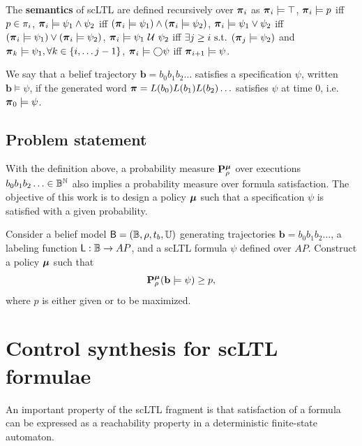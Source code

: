 \documentclass{ifacconf}
\begin{document}
\begin{definition}
 The \textbf{semantics} of scLTL are defined recursively  over ${\boldsymbol{\pi}}_i$ as
    ${\boldsymbol{\pi}}_i \models \top$,
    ${\boldsymbol{\pi}}_i \models p$ iff $p \in \pi_i$,
    ${\boldsymbol{\pi}}_i \models \psi_1 \wedge  \psi_2  $ iff $ ( {\boldsymbol{\pi}}_i \models \psi_1 ) \wedge ( {\boldsymbol{\pi}}_i \models \psi_2 ) $,
    ${\boldsymbol{\pi}}_i \models \psi_1 \vee  \psi_2  $ iff $ ( {\boldsymbol{\pi}}_i \models \psi_1 ) \vee ( {\boldsymbol{\pi}}_i \models \psi_2 ) $,
    ${\boldsymbol{\pi}}_i \models  \psi_1 \ \mathcal{U}\  \psi_2 $ iff $\exists j \geq i \text{ s.t. } ({\boldsymbol{\pi}}_j \models \psi_2 ) $ and ${\boldsymbol{\pi}}_k \models \psi_1, \forall k \in \{i, \ldots j-1\}$,
    ${\boldsymbol{\pi}}_i \models \bigcirc \psi$ iff ${\boldsymbol{\pi}}_{i+1} \models \psi$.
\end{definition}

We say that a belief trajectory $\mathbf{b} = b_0 b_1 b_2 \ldots$ satisfies a specification $\psi$, written $\mathbf{b} \models \psi$, if the generated word ${\boldsymbol{\pi}} = L(b_0) L(b_1) L(b_2) \ldots$ satisfies $\psi$ at time 0, i.e. ${\boldsymbol{\pi}}_0 \models \psi$.


\subsection{Problem statement}

With the definition above, a probability measure $\mathbf{P}_\rho^{\boldsymbol{\mu}}$ over executions $b_0 b_1 b_2 \ldots\in \mathbb{B}^{\mathbb N}$ also implies a probability measure over formula satisfaction. The objective of this work is to design a policy ${\boldsymbol{\mu}}$ such that a specification $\psi$ is satisfied with a given probability.

\begin{problem}
\label{prob:main}
  Consider a belief model $\mathsf{B} = (\mathbb{B}, \rho, t_b, {\mathbb{U}})$ generating trajectories $\mathbf{b} = b_0 b_1 b_2 \ldots$, a labeling function $\mathsf{L} : \mathbb{B} \rightarrow AP$, and a scLTL formula $\psi$ defined over $AP$. Construct a policy ${\boldsymbol{\mu}}$ such that
  \begin{equation}
    \mathbf{P}_\rho^{\boldsymbol{\mu}} ( \mathbf{b} \models \psi )\geq p,
  \end{equation}
  where $p$ is either given or to be maximized.
\end{problem}


\section{Control synthesis for scLTL formulae}
\label{sec:exact_synth}

An important property of the scLTL fragment is that satisfaction of a formula can be expressed as a reachability property in a deterministic finite-state automaton.
\end{document}
